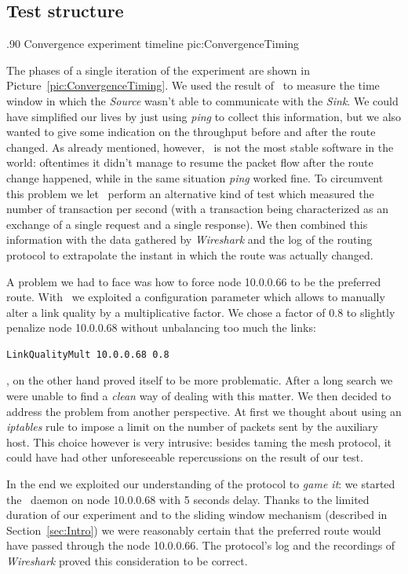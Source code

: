 \subsection{Test structure}

        {.90\columnwidth}
        {Convergence experiment timeline}
        {pic:ConvergenceTiming}


The phases of a single iteration of the experiment are shown in
Picture~\ref{pic:ConvergenceTiming}.
We used the result of \netperf\ to measure the time window in
which the \emph{Source} wasn't able to communicate with the
\emph{Sink}. We could have simplified our lives by just using \emph{ping}
to collect this information, but we also wanted to give some indication
on the throughput before and after the route changed. As already
mentioned, however, \netperf\ is not the most stable software in the
world: oftentimes it didn't manage to resume the packet flow after
the route change happened, while in the same situation \emph{ping} worked
fine. To circumvent this problem we let \netperf\ perform
an alternative kind of test which measured the number of transaction
per second (with a transaction being characterized as an exchange of a
single request and a single response).
We then combined this information with the data gathered
by \emph{Wireshark} and the log of the routing protocol to extrapolate
the instant in which the route was actually changed.

A problem we had to face was how to force node 10.0.0.66 to be the
preferred route. With \olsr\ we exploited a configuration parameter
which allows to manually alter a link quality by a multiplicative
factor. We chose a factor of $0.8$ to slightly penalize node 10.0.0.68
without unbalancing too much the links:

\begin{verbatim}
LinkQualityMult 10.0.0.68 0.8
\end{verbatim}

\batman, on the other hand proved itself to be more problematic. After a
long search
we were unable to find a \emph{clean} way of dealing with this
matter. We then decided to address the problem from another perspective.
At first we thought about using an \emph{iptables} rule to impose a
limit on the number of packets sent by the auxiliary host. This choice
however is very intrusive: besides taming the mesh protocol, it
could have had other unforeseeable repercussions on the result of our
test.

In the end we exploited our understanding of the protocol to \emph{game
it}: we started the \batman\ daemon on node 10.0.0.68 with 5 seconds
delay. Thanks to the limited duration of our experiment and to the sliding
window mechanism (described in Section~\ref{sec:Intro}) we were reasonably
certain that the preferred route would have passed through the node
10.0.0.66. The protocol's log and the recordings of \emph{Wireshark}
proved this consideration to be correct.

